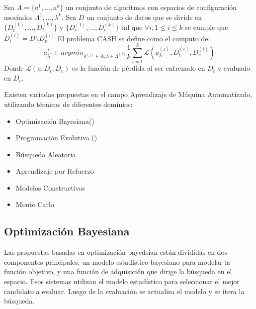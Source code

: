 \begin{definition}
    Sea $A = \{a^1, ..., a^k\}$  un conjunto de algoritmos con espacios de configuraci\'on asociados $\Lambda^1, ..., \lambda^k$.
    Sea $D$ un conjunto de datos  que se divide en $\{D_{t}^{(1)},..., D_{t}^{(k)}\}$ y $\{D_{v}^{(1)},..., D_{v}^{(k)}\}$ 
    tal que $\forall i, 1 \leq i \leq k$ se cumple que $D_{t}^{(i)} = D \setminus D^{(i)}_{v}$
    El problema CASH se define como el computo de:
    \begin{equation*}
        a^*_{\lambda^*} \in argmin_{a^{(j)} \in A, \lambda \in \Lambda^{(j)}} \frac{1}{k} \sum^{k}_{i = 1}\mathcal{L}(a^(j)_\lambda, D^{(i)}_t, D^{(i)}_v)
    \end{equation*}
    Donde $\mathcal{L}(a, D_t, D_v)$ es la funci\'on de p\'erdida al ser entrenado en $D_t$ y evaluado en $D_v$.
\end{definition}



Existen variadas propuestas en el campo Aprendizaje de M\'aquina Automatizado, utilizando t\'ecnicas de diferentes dominios:
\begin{itemize}
    \item Optimizaci\'on Bayesiana(\cite{hutter2019automated})
    \item Programaci\'on Evolutiva (\cite{chen2018autostacker})
    \item B\'usqueda Aleatoria 
    \item Aprendizaje por Refuerzo
    \item Modelos Constructivos
    \item Monte Carlo
\end{itemize}

\subsection{Optimizaci\'on Bayesiana}
Las propuestas basadas en optimizaci\'on bayedsian est\'an divididas en dos componentes principales: un modelo estad\'istico bayesiano para modelar la funci\'on objetivo, y una funci\'on de adquisici\'on que dirige la b\'usqueda en el espacio. Esos sistemas utilizan el modelo estad\'istico para seleccionar el mejor candidato a evaluar. Luego de la evaluaci\'on se actualiza el modelo y se itera la b\'usqueda.

